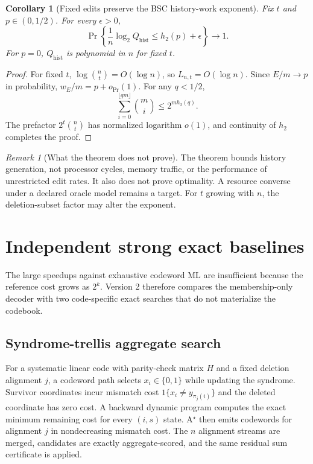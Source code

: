 \documentclass[11pt]{article}
\newtheorem{corollary}{Corollary}
\theoremstyle{definition}
\theoremstyle{remark}
\newtheorem{remark}{Remark}
\newcommand{\Qhist}{Q_{\mathrm{hist}}}
\begin{document}
\begin{corollary}[Fixed edits preserve the BSC history-work exponent]
\label{cor:exponent}
Fix $t$ and $p\in(0,1/2)$.  For every $\epsilon>0$,
\[
 \Pr\left\{\frac1n\log_2\Qhist\le h_2(p)+\epsilon\right\}\longrightarrow 1.
\]
For $p=0$, $\Qhist$ is polynomial in $n$ for fixed $t$.
\end{corollary}

\begin{proof}
For fixed $t$, $\log\binom nt=O(\log n)$, so $L_{n,t}=O(\log n)$.  Since $E/m\to p$ in probability, $w_E/m=p+o_{\Pr}(1)$.  For any $q<1/2$,
\[
 \sum_{i=0}^{\lfloor qm\rfloor}\binom mi\le 2^{m h_2(q)}.
\]
The prefactor $2^t\binom nt$ has normalized logarithm $o(1)$, and continuity of $h_2$ completes the proof.
\end{proof}

\begin{remark}[What the theorem does not prove]
The theorem bounds history generation, not processor cycles, memory traffic, or the performance of unrestricted edit rates.  It also does not prove optimality.  A resource converse under a declared oracle model remains a target.  For $t$ growing with $n$, the deletion-subset factor may alter the exponent.
\end{remark}

\section{Independent strong exact baselines}
The large speedups against exhaustive codeword ML are insufficient because the reference cost grows as $2^k$.  Version 2 therefore compares the membership-only decoder with two code-specific exact searches that do not materialize the codebook.

\subsection{Syndrome-trellis aggregate search}
For a systematic linear code with parity-check matrix $H$ and a fixed deletion alignment $j$, a codeword path selects $x_i\in\{0,1\}$ while updating the syndrome.  Survivor coordinates incur mismatch cost $1\{x_i\ne y_{\pi_j(i)}\}$ and the deleted coordinate has zero cost.  A backward dynamic program computes the exact minimum remaining cost for every $(i,s)$ state.  A$^\star$ then emits codewords for alignment $j$ in nondecreasing mismatch cost.  The $n$ alignment streams are merged, candidates are exactly aggregate-scored, and the same residual sum certificate is applied.
\end{document}
